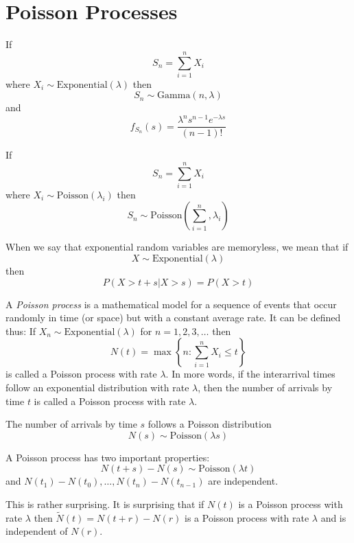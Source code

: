 \section{Poisson Processes}
If
\begin{equation}
    S_n = \sum_{i=1}^{n}X_i
\end{equation}
where $X_i \sim \text{Exponential}(\lambda)$
then
\begin{equation}
    S_n \sim \text{Gamma}(n, \lambda)
\end{equation}
and
\begin{equation}
    f_{S_n}(s) = \frac{\lambda^n s^{n-1} e^{-\lambda s}}{(n-1)!}
\end{equation}

If
\begin{equation}
    S_n = \sum_{i=1}^{n}X_i
\end{equation}
where $X_i \sim \text{Poisson}(\lambda_i)$
then
\begin{equation}
    S_n \sim \text{Poisson}(\sum_{i=1}^{n}, \lambda_i)
\end{equation}

When we say that exponential random variables
are memoryless, we mean that if
\begin{equation}
    X \sim \text{Exponential}(\lambda)
\end{equation}
then
\begin{equation}
    P(X > t + s | X > s) = P(X > t)
\end{equation}

A \emph{Poisson process} is a mathematical model for a
sequence of events that occur randomly in time (or space)
but with a constant average rate.
It can be defined thus:
If $X_n \sim \text{Exponential}(\lambda)$ for
$n = 1, 2, 3, \dots$ then
\begin{equation}
    N(t) = \max \left\{n: \sum_{i=1}^{n} X_i \leq t\right\}
\end{equation}
is called a Poisson process with rate $\lambda$.
In more words, if the interarrival times follow
an exponential distribution with rate $\lambda$,
then the number of arrivals by time $t$ is called
a Poisson process with rate $\lambda$.

The number of arrivals by time $s$ follows
a Poisson distribution
\begin{equation}
    N(s) \sim \text{Poisson}(\lambda s)
\end{equation}

A Poisson process has two important
properties:
\begin{equation}
    N(t+s) - N(s) \sim \text{Poisson}(\lambda t)
\end{equation}
and
$N(t_1) - N(t_0), \dots, N(t_n) - N(t_{n-1})$ are
independent.

This is rather surprising. It is surprising that
if $N(t)$ is a Poisson process with rate $\lambda$
then $\tilde{N}(t) = N(t + r) - N(r)$ is a Poisson
process with rate $\lambda$ and is independent of $N(r)$.